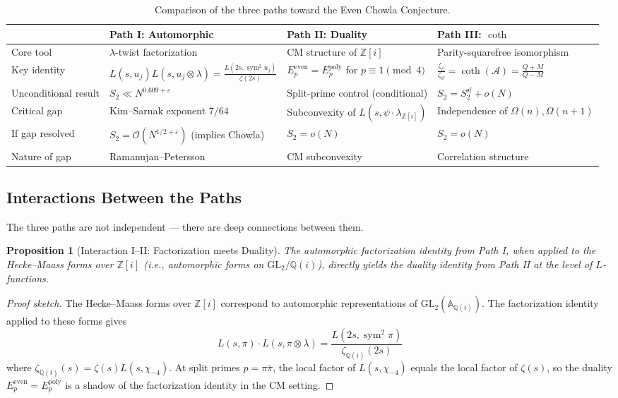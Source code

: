 \documentclass[11pt,a4paper]{article}
\theoremstyle{plain}
\newtheorem{proposition}[theorem]{Proposition}
\theoremstyle{definition}
\newcommand{\EE}{\mathcal{E}}
\newcommand{\OO}{\mathcal{O}}
\newcommand{\cA}{\mathcal{A}}
\newcommand{\sym}{\operatorname{sym}}
\newcommand{\GL}{\mathrm{GL}}
\begin{document}
\begin{table}[htbp]
\centering
\caption{Comparison of the three paths toward the Even Chowla Conjecture.}
\label{tab:comparison}
\begin{tabularx}{\textwidth}{lXXX}
\toprule
& \textbf{Path I: Automorphic} & \textbf{Path II: Duality} & \textbf{Path III: $\coth$} \\
\midrule
Core tool & $\lambda$-twist factorization & CM structure of $\mathbb{Z}[i]$ & Parity-squarefree isomorphism \\
Key identity & $L(s,u_j) L(s,u_j \otimes \lambda) = \frac{L(2s,\sym^2 u_j)}{\zeta(2s)}$ & $E_p^{\mathrm{even}} = E_p^{\mathrm{poly}}$ for $p \equiv 1 \pmod 4$ & $\frac{\zeta_{\EE}}{\zeta_{\OO}} = \coth(\cA) = \frac{Q+M}{Q-M}$ \\
Unconditional result & $S_2 \ll N^{0.609+\varepsilon}$ & Split-prime control (conditional) & $S_2 = S_2^{\mathrm{sf}} + o(N)$ \\
Critical gap & Kim--Sarnak exponent $7/64$ & Subconvexity of $L(s, \psi \cdot \lambda_{\mathbb{Z}[i]})$ & Independence of $\Omega(n), \Omega(n+1)$ \\
If gap resolved & $S_2 = \mathcal{O}(N^{1/2+\varepsilon})$ (implies Chowla) & $S_2 = o(N)$ & $S_2 = o(N)$ \\
Nature of gap & Ramanujan--Petersson & CM subconvexity & Correlation structure \\
\bottomrule
\end{tabularx}
\end{table}

\subsection{Interactions Between the Paths}

The three paths are not independent --- there are deep connections between them.

\begin{proposition}[Interaction I--II: Factorization meets Duality]
The automorphic factorization identity from Path I, when applied to the Hecke--Maass forms over $\mathbb{Z}[i]$ (i.e., automorphic forms on $\GL_2 / \mathbb{Q}(i)$), directly yields the duality identity from Path II at the level of $L$-functions.
\end{proposition}

\begin{proof}[Proof sketch]
The Hecke--Maass forms over $\mathbb{Z}[i]$ correspond to automorphic representations of $\GL_2(\mathbb{A}_{\mathbb{Q}(i)})$. The factorization identity applied to these forms gives
\[
L(s, \pi) \cdot L(s, \pi \otimes \lambda) = \frac{L(2s, \sym^2 \pi)}{\zeta_{\mathbb{Q}(i)}(2s)}
\]
where $\zeta_{\mathbb{Q}(i)}(s) = \zeta(s) L(s, \chi_{-4})$. At split primes $p = \pi \bar{\pi}$, the local factor of $L(s, \chi_{-4})$ equals the local factor of $\zeta(s)$, so the duality $E_p^{\mathrm{even}} = E_p^{\mathrm{poly}}$ is a shadow of the factorization identity in the CM setting.
\end{proof}
\end{document}
